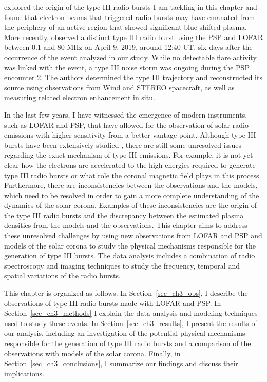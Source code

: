 \cite{harra_2021} explored the origin of the type III radio bursts I am tackling in this chapter and found that electron beams that triggered radio bursts may have emanated from the periphery of an active region that showed significant blue-shifted plasma.
More recently, \cite{badman_2022} observed a distinct type III radio burst using the PSP and LOFAR between 0.1 and 80 MHz on April 9, 2019, around 12:40 UT, six days after the occurrence of the event analyzed in our study. While no detectable flare activity was linked with the event, a type III noise storm was ongoing during the PSP encounter 2. The authors determined the type III trajectory and reconstructed its source using observations from Wind and STEREO spacecraft, as well as measuring related electron enhancement in situ.

In the last few years, I have witnessed the emergence of modern instruments, such as LOFAR and PSP, that have allowed for the observation of solar radio emissions with higher sensitivity from a better vantage point. Although type III bursts have been extensively studied \cite{dabrowski_2021}, there are still some unresolved issues regarding the exact mechanism of type III emissions.
For example, it is not yet clear how the electrons are accelerated to the high energies required to generate type III radio bursts or what role the coronal magnetic field plays in this process.
Furthermore, there are inconsistencies between the observations and the models, which need to be resolved in order to gain a more complete understanding of the dynamics of the solar corona. Examples of these inconsistencies are the origin of the type III radio bursts and the discrepancy between the estimated plasma densities from the models and the observations. This chapter aims to address these unresolved challenges by using new observations from LOFAR and PSP and models of the solar corona to study the physical mechanisms responsible for the generation of type III bursts.
The data analysis includes a combination of radio spectroscopy and imaging techniques to study the frequency, temporal and spatial variations of the radio bursts. 

This chapter is organized as follows. In Section~\ref{sec_ch3_obs}, I describe the observations of type III radio bursts made with LOFAR and PSP. In Section~\ref{sec_ch3_methods} I explain the data analysis and modeling techniques used to study these events. In Section~\ref{sec_ch3_results}, I present the results of our analysis, including an investigation of the potential physical mechanisms responsible for the generation of type III radio bursts and a comparison of the observations with models of the solar corona. Finally, in Section~\ref{sec_ch3_conclusions}, I summarize our findings and discuss their implications.

